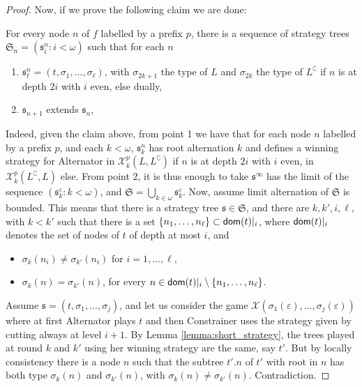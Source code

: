 \begin{proof}
Now, if we prove the following claim we are done:
\begin{claim}\label{claim:strategy}
For every node $n$ of $f$ labelled by a prefix $p$, 
there is a sequence of strategy trees $\mathfrak{S}_n=(\mathfrak{s}^n_i: i < \omega)$ such that for each $n$
\begin{enumerate}
\item $\mathfrak{s}^n_\ell=(t, \sigma_1, \dots, \sigma_\ell)$, with $\sigma_{2k+1}$ the type of $L$ and $\sigma_{2k}$ the type of  $L^\complement$ if $n$ is at depth $2i$ with $i$ even, else dually,
\item $\mathfrak{s}_{n+1}$ extends $\mathfrak{s}_n$,
\end{enumerate}
\end{claim}
Indeed, given the claim above, from point 1 we have that
for each node $n$ labelled by a prefix $p$, and each $k < \omega$, $\mathfrak{s}^n_k$ has root alternation $k$ and defines a winning strategy for Alternator in $\mathcal{X}^p_k(L, L^\complement)$ if $n$ is at depth $2i$ with $i$ even, in $\mathcal{X}^p_k(L^\complement, L)$ else.
From point 2, it is thus enough to take $\mathfrak{s}^\infty$ has the limit of the sequence $(\mathfrak{s}^\varepsilon_k: k < \omega)$, and $\mathfrak{S}=\bigcup_{k \in \omega} \mathfrak{s}^\varepsilon_k$. 
Now, assume limit alternation of $\mathfrak{S}$ is bounded.
This means that there is a strategy tree $\mathfrak{s} \in \mathfrak{S}$, and there are $k, k', i, \ell, $ with $k < k'$ such that
 there is a set $\{n_1, \dots, n_\ell\} \subset \mathsf{dom}(t)|_i$, where $\mathsf{dom}(t)|_i$ denotes the set of nodes of $t$ of depth at most $i$, and
\begin{itemize}
\item $\sigma_k(n_i)\neq \sigma_{k'}(n_i)$ for $i=1, \dots, \ell$,
\item $\sigma_k(n)= \sigma_{k'}(n)$, for every $n \in \mathsf{dom}(t)|_i \setminus \{n_1, \dots, n_\ell\}$.
\end{itemize}
Assume $\mathfrak{s}=(t, \sigma_1, \dots, \sigma_j)$, and let us consider the game $\mathcal{X}( \sigma_1(\varepsilon), \dots, \sigma_j(\varepsilon))$ where at first Alternator plays $t$ and then Constrainer uses the strategy given by cutting always at level $i+1$. By Lemma \ref{lemma:short_strategy}, the trees played at round $k$ and $k'$ using her winning strategy are the same, say $t'$. But by locally consistency there is a node $n$ such that the subtree $t'.n$ of $t'$ with root in $n$ has both type $\sigma_k(n)$ and $\sigma_{k'}(n)$, with $\sigma_k(n) \neq \sigma_{k'}(n)$. Contradiction.




\end{proof}
